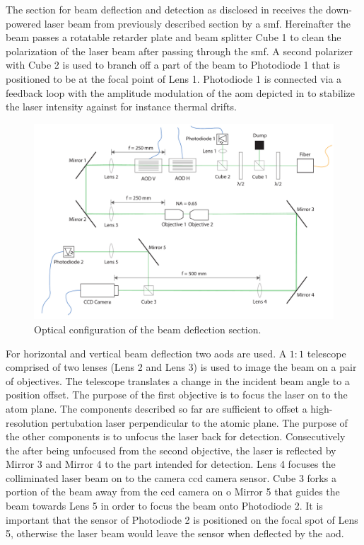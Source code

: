 The section for beam deflection and detection as disclosed in
 receives the down-powered laser beam from
previously described section by a \gls{smf}. Hereinafter the beam passes a
rotatable retarder plate and beam splitter Cube \num{1} to clean the
polarization of the laser beam after passing through the \gls{smf}. A second
polarizer with Cube \num{2} is used to branch off a part of the beam to
Photodiode \num{1} that is positioned to be at the focal point of Lens
\num{1}. Photodiode \num{1} is connected via a feedback loop with the
amplitude modulation of the \gls{aom} depicted in
 to stabilize the laser intensity against for
instance thermal drifts.
\begin{figure}[htb]
  \centering
  \includegraphics[width=\textwidth]{../figure/setup/beam-deflection.pdf}
  \caption{Optical configuration of the beam deflection section.
  }\label{fig:setup_beam_deflection}
\end{figure}
For horizontal and vertical beam deflection two \gls{aod}s are used. A $1:1$
telescope comprised of two lenses (Lens \num{2} and Lens \num{3}) is used to
image the beam on a pair of objectives. The telescope translates a change in
the incident beam angle to a position offset. The purpose of the first
objective is to focus the laser on to the atom plane. The components described
so far are sufficient to offset a high-resolution pertubation laser
perpendicular to the atomic plane. The purpose of the other components is to
unfocus the laser back for detection. Consecutively the after being unfocused
from the second objective, the laser is reflected by Mirror \num{3} and
Mirror \num{4} to the part intended for detection. Lens \num{4} focuses the
colliminated laser beam on to the camera \gls{ccd} camera sensor. Cube \num{3}
forks a portion of the beam away from the \gls{ccd} camera on o Mirror \num{5}
that guides the beam towards Lens \num{5} in order to focus the beam onto
Photodiode \num{2}. It is important that the sensor of Photodiode \num{2} is
positioned on the focal spot of Lens \num{5}, otherwise the laser beam would
leave the sensor when deflected by the \gls{aod}.

